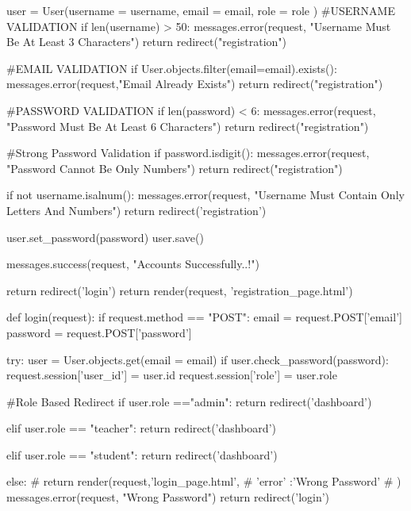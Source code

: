         user = User(username = username, 
                    email = email, 
                    role = role
                    )
        #USERNAME VALIDATION
        if len(username) > 50:
            messages.error(request, "Username Must Be At Least 3 Characters")
            return redirect("registration")
    
        #EMAIL VALIDATION
        if User.objects.filter(email=email).exists():
            messages.error(request,"Email Already Exists")
            return redirect("registration")
        
        #PASSWORD VALIDATION
        if len(password) < 6:
            messages.error(request, "Password Must Be At Least 6 Characters")
            return redirect("registration")
        
        #Strong Password Validation
        if password.isdigit():
            messages.error(request, "Password Cannot Be Only Numbers")
            return redirect("registration")
        
        if not username.isalnum():
            messages.error(request, "Username Must Contain Only Letters And Numbers")
            return  redirect('registration')
        
        
        user.set_password(password)
        user.save()

        messages.success(request, "Accounts Successfully..!")

        return redirect('login')
    return render(request, 'registration_page.html')



def login(request):
    if request.method == "POST":
        email = request.POST['email']
        password = request.POST['password']

        try:
            user = User.objects.get(email = email)
            if user.check_password(password):
                request.session['user_id'] = user.id
                request.session['role'] = user.role
                
                #Role Based Redirect
                if user.role =="admin":
                    return redirect('dashboard')
                
                elif user.role == "teacher":
                    return redirect('dashboard')
                
                elif user.role == "student":
                    return redirect('dashboard')
                
            else:
                # return render(request,'login_page.html',{
                #     'error' :'Wrong Password'
                # })
                messages.error(request, "Wrong Password")
                return redirect('login')
                
